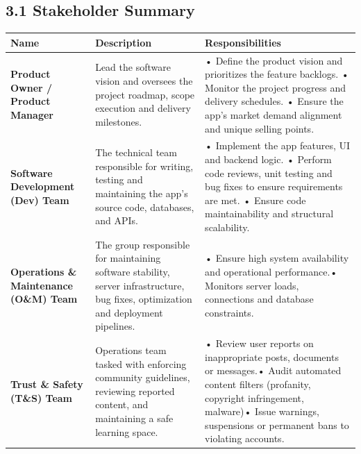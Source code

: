 \documentclass[12pt]{article}
\renewcommand{\baselinestretch}{1.5}
\begin{document}
\subsection*{3.1 Stakeholder Summary}
\par\medskip
\begingroup
\scriptsize
\renewcommand{\baselinestretch}{1.0}\selectfont
\renewcommand{\arraystretch}{1.15}
\setlength{\tabcolsep}{4pt}
\begin{longtable}{|>{\raggedright\arraybackslash}p{}|>{\raggedright\arraybackslash}p{}|>{\raggedright\arraybackslash}p{}|}
\hline
Name & Description & Responsibilities \\ \hline
\endhead
\textbf{Product Owner /\allowbreak{} Product Manager} & Lead the software vision and oversees the project roadmap, scope execution and delivery milestones. & • Define the product vision and prioritizes the feature backlogs.\newline{}  • Monitor the project progress and delivery schedules.\newline{}  • Ensure the app’s market demand alignment and unique selling points. \\ \hline
\textbf{Software Development (Dev) Team} & The technical team responsible for writing, testing and maintaining the app’s source code, databases, and APIs. & • Implement the app features, UI and backend logic.\newline{}  • Perform code reviews, unit testing and bug fixes to ensure requirements are met.\newline{}  • Ensure code maintainability and structural scalability. \\ \hline
\textbf{Operations \& Maintenance (O\&M) Team} & The group responsible for maintaining software stability, server infrastructure, bug fixes, optimization and deployment pipelines. & • Ensure high system availability and operational performance.\newline{}• Monitors server loads, connections and database constraints. \\ \hline
\textbf{Trust \& Safety (T\&S) Team} & Operations team tasked with enforcing community guidelines, reviewing reported content, and maintaining a safe learning space. & • Review user reports on inappropriate posts, documents or messages.\newline{}• Audit automated content filters (profanity, copyright infringement, malware)\newline{}• Issue warnings, suspensions or permanent bans to violating accounts. \\ \hline
\end{longtable}
\endgroup
\par\medskip
\hypertarget{sec:32-user-summary}{}
\end{document}

